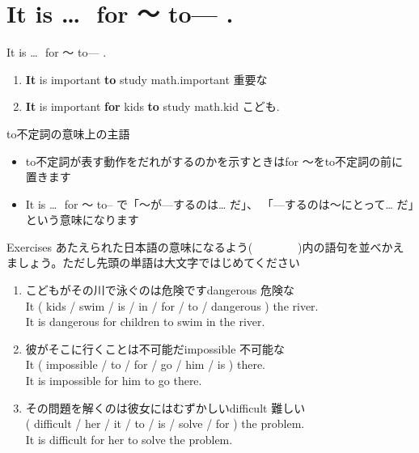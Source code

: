 \documentclass[aspectratio=169,xcolor={dvipsnames,table}]{beamer}
\begin{document}
\section{It is \ldots\,\, for ～ to--- .}
\begin{frame}[plain]{It is \ldots\,\, for ～ to--- .}
 \large

\begin{enumerate}
 \item {\bfseries It} is important {\bfseries to} study math.\hfill{\scriptsize important  重要な}
 \item {\bfseries It} is important {\bfseries for} kids {\bfseries to} study math.\hfill{\scriptsize kid  こども}.
\end{enumerate}

\begin{block}{to不定詞の意味上の主語}\small
\begin{itemize}[square]
 \item to不定詞が表す動作をだれがするのかを示すときはfor ～をto不定詞の前に置きます
 \item It is \ldots\,\, for ～ to--\,\,で「～が---するのは\ldots\,\,だ」、
「---するのは～にとって\ldots\,\,だ」という意味になります
\end{itemize}
\end{block}
\mbox{}\hfill{\scriptsize {}}
\end{frame}
\begin{frame}[plain]{Exercises}
 あたえられた日本語の意味になるよう(~~~~~~~~)内の語句を並べかえましょう。ただし先頭の単語は大文字ではじめてください%
\mbox{}\hfill{\scriptsize {}}

\begin{enumerate}
 \item こどもがその川で泳ぐのは危険です\hfill{\scriptsize dangerous  危険な}\\
It ( kids / swim / is / in / for / to / dangerous ) the river.\\
It is dangerous for children to swim in the river.
 \item 彼がそこに行くことは不可能だ\hfill{\scriptsize impossible  不可能な}\\
It ( impossible / to / for / go / him / is ) there.\\
It is impossible for him to go there.
 \item その問題を解くのは彼女にはむずかしい\hfill{\scriptsize difficult  難しい}\\
( difficult / her / it / to / is / solve / for ) the problem.\\
It is difficult for her to solve the problem.

\end{enumerate}
\end{frame}
\end{document}
